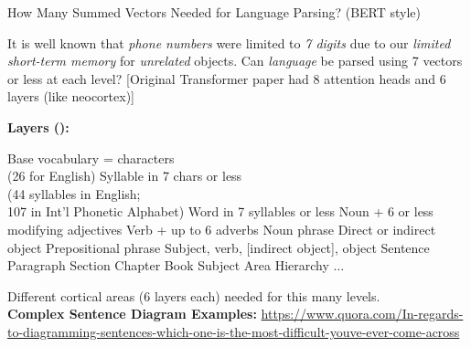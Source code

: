 \begin{slide}[\slideopts,toc={Language}]{How Many Summed Vectors Needed for Language Parsing? (BERT style)}

\maybepause
\vspace{-1em}

It is well known that \emph{phone numbers} were limited to \emph{7
digits} due to our \emph{limited short-term memory} for \emph{unrelated}
objects. \maybepause Can \emph{language} be parsed using 7 vectors or
less at each level? [Original Transformer paper had 8 attention heads and 6 layers (like neocortex)]

\maybepause

\textbf{Layers (\eg):}
\vspace{-1em}
\begin{multicols}{2}
\begin{enumerate}
 \mpitem Base vocabulary = characters\\
  (26 for English)
  \mpitem Syllable in 7 chars or less\\
  (44 syllables in English;\\
   107 in Int'l Phonetic Alphabet)
  \mpitem Word in 7 syllables or less
  \mpitem Noun + 6 or less modifying adjectives
  \mpitem Verb + up to 6 adverbs
  \mpitem Noun phrase
  \columnbreak
  \mpitem Direct or indirect object
  \mpitem Prepositional phrase
  \mpitem Subject, verb, [indirect object], object
  \mpitem Sentence
  \mpitem Paragraph
  \mpitem Section
  \mpitem Chapter
  \mpitem Book
 \mpitem Subject Area Hierarchy $\ldots$
\end{enumerate}
\end{multicols}
\maybepause
\vspace{-1em}
Different cortical areas (6 layers each) needed for this many levels.\\
\maybepause
\textbf{Complex Sentence Diagram Examples:}
{\tiny
\url{https://www.quora.com/In-regards-to-diagramming-sentences-which-one-is-the-most-difficult-youve-ever-come-across}
}
\end{slide}

